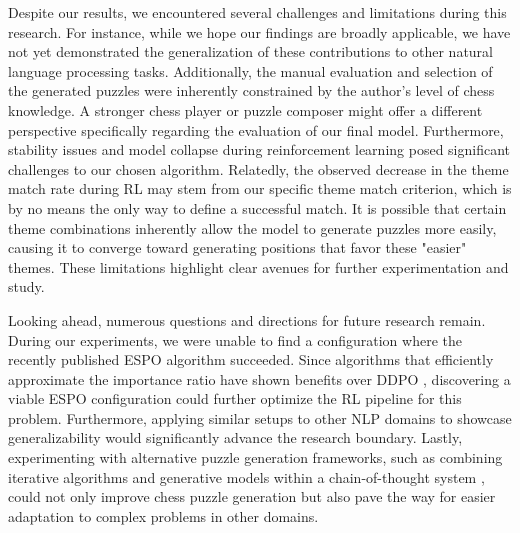 Despite our results, we encountered several challenges and limitations during this research. For instance, while we hope our findings are broadly applicable, we have not yet demonstrated the generalization of these contributions to other natural language processing tasks. Additionally, the manual evaluation and selection of the generated puzzles were inherently constrained by the author's level of chess knowledge. A stronger chess player or puzzle composer might offer a different perspective specifically regarding the evaluation of our final model. Furthermore, stability issues and model collapse during reinforcement learning posed significant challenges to our chosen algorithm. Relatedly, the observed decrease in the theme match rate during RL may stem from our specific theme match criterion, which is by no means the only way to define a successful match. It is possible that certain theme combinations inherently allow the model to generate puzzles more easily, causing it to converge toward generating positions that favor these "easier" themes. These limitations highlight clear avenues for further experimentation and study.

Looking ahead, numerous questions and directions for future research remain. During our experiments, we were unable to find a configuration where the recently published ESPO algorithm succeeded. Since algorithms that efficiently approximate the importance ratio have shown benefits over DDPO \cite{ou2025principledrldiffusionllms, wang2026d2improvingresoning}, discovering a viable ESPO configuration could further optimize the RL pipeline for this problem. Furthermore, applying similar setups to other NLP domains to showcase generalizability would significantly advance the research boundary. Lastly, experimenting with alternative puzzle generation frameworks, such as combining iterative algorithms and generative models within a chain-of-thought system \cite{wei2022chainofthought}, could not only improve chess puzzle generation but also pave the way for easier adaptation to complex problems in other domains.
